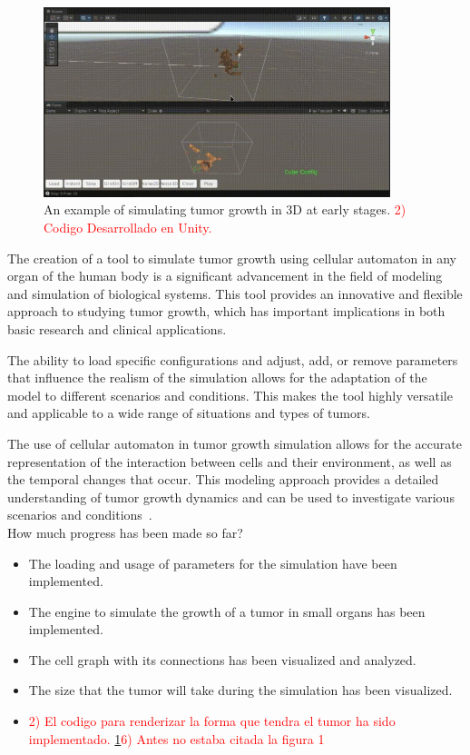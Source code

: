 \documentclass[a4paper,11pt]{article}
\begin{document}
{\begin{figure}[h]
  \centering
  \includegraphics[width=0.9\textwidth]{tumor.jpg}
  \caption{An example of simulating tumor growth in 3D at early stages. \textcolor{red}{2) Codigo Desarrollado en Unity.}}
  \label{fig:tumor}
\end{figure}

The creation of a tool to simulate tumor growth using cellular automaton in any organ of the human body is a significant advancement in the field of modeling and simulation of biological systems. This tool provides an innovative and flexible approach to studying tumor growth, which has important implications in both basic research and clinical applications.

The ability to load specific configurations and adjust, add, or remove parameters that influence the realism of the simulation allows for the adaptation of the model to different scenarios and conditions. This makes the tool highly versatile and applicable to a wide range of situations and types of tumors.

The use of cellular automaton in tumor growth simulation allows for the accurate representation of the interaction between cells and their environment, as well as the temporal changes that occur. This modeling approach provides a detailed understanding of tumor growth dynamics and can be used to investigate various scenarios and conditions~\cite{2}.\\

How much progress has been made so far?
\begin{itemize}
    \item The loading and usage of parameters for the simulation have been implemented.
    \item The engine to simulate the growth of a tumor in small organs has been implemented.
    \item The cell graph with its connections has been visualized and analyzed.
    \item The size that the tumor will take during the simulation has been visualized.
    \item \textcolor{red}{2) El codigo para renderizar la forma que tendra el tumor ha sido implementado.} \ref{fig:tumor}\textcolor{red}{6) Antes no estaba citada la figura 1}
\end{itemize}

}
\end{document}
